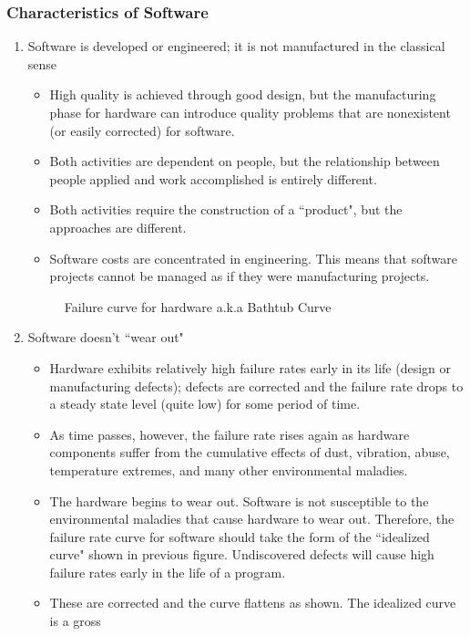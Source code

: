 \documentclass{article}
\begin{document}
	\subsubsection{Characteristics of Software}
	\begin{enumerate}[label=\arabic*.]
		\item Software is developed or engineered; it is not manufactured in the classical sense
			\begin{itemize}
				\item High quality is achieved through good design, but the manufacturing phase for hardware
					can introduce quality problems that are nonexistent (or easily corrected) for software.
				\item Both activities are dependent on people, but the relationship between people applied and
					work accomplished is entirely different.
				\item Both activities require the construction of a ``product", but the approaches are
					different.
				\item Software costs are concentrated in engineering. This means that software projects cannot
					be managed as if they were manufacturing projects.
			\end{itemize}
			\begin{figure}[H]
				\centering
				
				\caption{Failure curve for hardware a.k.a Bathtub Curve}
			\end{figure}
		\item Software doesn't ``wear out"
			\begin{itemize}
				\item Hardware exhibits relatively high failure rates early in its life (design or manufacturing
					defects); defects are corrected and the failure rate drops to a steady state level (quite
					low) for some period of time.
				\item As time passes, however, the failure rate rises again as hardware components suffer from
					the cumulative effects of dust, vibration, abuse, temperature extremes, and many other
					environmental maladies.
				\item The hardware begins to wear out. Software is not susceptible to the
					environmental maladies that cause hardware to wear out. Therefore, the failure rate curve
					for software should take the form of the ``idealized curve" shown in previous figure.
					Undiscovered defects will cause high failure rates early in the life of a program.
				\item These are corrected and the curve flattens as shown. The idealized curve is a gross

\end{itemize}
\end{enumerate}
\end{document}
